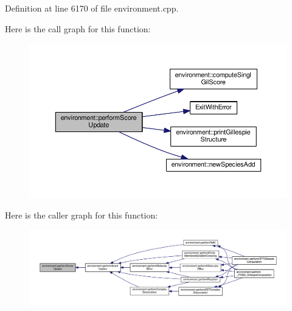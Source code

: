 Definition at line 6170 of file environment.\-cpp.



Here is the call graph for this function\-:\nopagebreak
\begin{figure}[H]
\begin{center}
\leavevmode
\includegraphics[width=350pt]{a00003_ad25f6aa3ab2ac6097f57828bcf78e5c9_cgraph}
\end{center}
\end{figure}




Here is the caller graph for this function\-:\nopagebreak
\begin{figure}[H]
\begin{center}
\leavevmode
\includegraphics[width=350pt]{a00003_ad25f6aa3ab2ac6097f57828bcf78e5c9_icgraph}
\end{center}
\end{figure}


